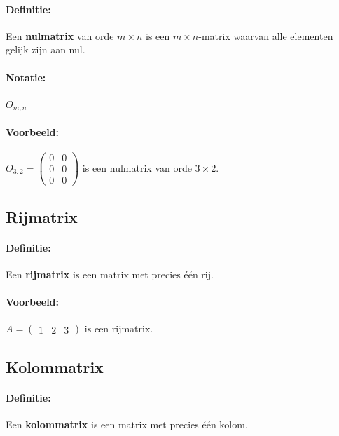 \documentclass[12pt,twoside]{article}
\begin{document}
\paragraph*{Definitie:}

Een {\bf nulmatrix} van orde $m \times n$ is een $m \times n$-matrix waarvan alle elementen gelijk zijn aan nul.

\paragraph*{Notatie:}

$O_{m,n}$

\paragraph*{Voorbeeld:}

$O_{3,2}=
\begin{pmatrix}
  0 & 0 \\ 0 & 0 \\ 0 & 0
\end{pmatrix}
$ is een nulmatrix van orde $3 \times 2$.

\subsection{Rijmatrix}

\paragraph*{Definitie:}

Een {\bf rijmatrix} is een matrix met precies één rij.
\paragraph*{Voorbeeld:}

$A=
\begin{pmatrix}
  1 & 2 & 3
\end{pmatrix}
$ is een rijmatrix.

\subsection{Kolommatrix}

\paragraph*{Definitie:}

Een {\bf kolommatrix} is een matrix met precies één kolom.
\end{document}
